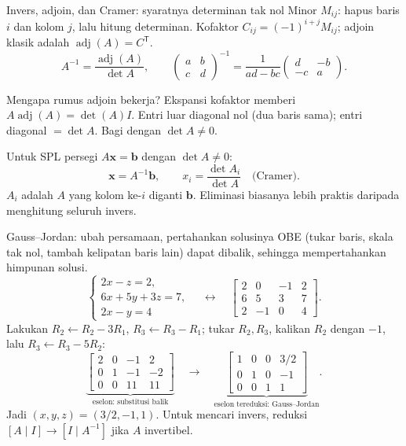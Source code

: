 \documentclass[11pt,aspectratio=169]{beamer}
\newcommand{\vect}[1]{\boldsymbol{#1}}
\DeclareMathOperator{\adj}{adj}
\begin{document}
\begin{frame}{Invers, adjoin, dan Cramer: syaratnya determinan tak nol}
\small
Minor $M_{ij}$: hapus baris $i$ dan kolom $j$, lalu hitung determinan.
Kofaktor $C_{ij}=(-1)^{i+j}M_{ij}$; adjoin klasik adalah $\adj(A)=C^{\mathsf T}$.
\[
\boxed{A^{-1}=\frac{\adj(A)}{\det A}},\qquad
\begin{pmatrix}a&b\\c&d\end{pmatrix}^{-1}
=\frac1{ad-bc}\begin{pmatrix}d&-b\\-c&a\end{pmatrix}.
\]
\begin{block}{Mengapa rumus adjoin bekerja?}
Ekspansi kofaktor memberi $A\adj(A)=\det(A)I$.
Entri luar diagonal nol (dua baris sama); entri diagonal $=\det A$.
Bagi dengan $\det A\ne0$.
\end{block}
Untuk SPL persegi $A\vect{x}=\vect{b}$ dengan $\det A\ne0$:
\[
\vect{x}=A^{-1}\vect{b},\qquad
x_i=\frac{\det A_i}{\det A}\quad\text{(Cramer)}.
\]
$A_i$ adalah $A$ yang kolom ke-$i$ diganti $\vect{b}$.
Eliminasi biasanya lebih praktis daripada menghitung seluruh invers.
\end{frame}

\begin{frame}{Gauss--Jordan: ubah persamaan, pertahankan solusinya}
\small
OBE (tukar baris, skala tak nol, tambah kelipatan baris lain) dapat dibalik,
sehingga mempertahankan himpunan solusi.
\[
\begin{cases}2x-z=2,\\6x+5y+3z=7,\\2x-y=4\end{cases}
\quad\longleftrightarrow\quad
\left[\begin{array}{ccc|c}2&0&-1&2\\6&5&3&7\\2&-1&0&4\end{array}\right].
\]
Lakukan $R_2\leftarrow R_2-3R_1$, $R_3\leftarrow R_3-R_1$;
tukar $R_2,R_3$, kalikan $R_2$ dengan $-1$, lalu $R_3\leftarrow R_3-5R_2$:
\[
\underbrace{\left[\begin{array}{ccc|c}2&0&-1&2\\0&1&-1&-2\\0&0&11&11\end{array}\right]}_{\text{eselon: substitusi balik}}
\quad\longrightarrow\quad
\underbrace{\left[\begin{array}{ccc|c}1&0&0&3/2\\0&1&0&-1\\0&0&1&1\end{array}\right]}_{\text{eselon tereduksi: Gauss--Jordan}}.
\]
Jadi $(x,y,z)=(3/2,-1,1)$.
Untuk mencari invers, reduksi $[A\mid I]\to[I\mid A^{-1}]$ jika $A$ invertibel.
\end{frame}
\end{document}
